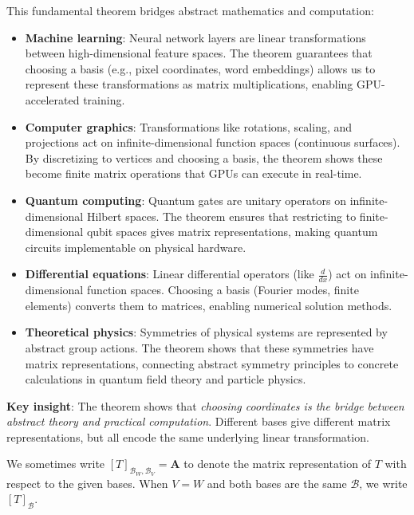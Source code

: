 \begin{remark}
  This fundamental theorem bridges abstract mathematics and computation:
  \begin{itemize}
    \item \textbf{Machine learning}: Neural network layers are linear transformations between high-dimensional feature spaces. The theorem guarantees that choosing a basis (e.g., pixel coordinates, word embeddings) allows us to represent these transformations as matrix multiplications, enabling GPU-accelerated training.

    \item \textbf{Computer graphics}: Transformations like rotations, scaling, and projections act on infinite-dimensional function spaces (continuous surfaces). By discretizing to vertices and choosing a basis, the theorem shows these become finite matrix operations that GPUs can execute in real-time.

    \item \textbf{Quantum computing}: Quantum gates are unitary operators on infinite-dimensional Hilbert spaces. The theorem ensures that restricting to finite-dimensional qubit spaces gives matrix representations, making quantum circuits implementable on physical hardware.

    \item \textbf{Differential equations}: Linear differential operators (like $\frac{d}{dx}$) act on infinite-dimensional function spaces. Choosing a basis (Fourier modes, finite elements) converts them to matrices, enabling numerical solution methods.

    \item \textbf{Theoretical physics}: Symmetries of physical systems are represented by abstract group actions. The theorem shows that these symmetries have matrix representations, connecting abstract symmetry principles to concrete calculations in quantum field theory and particle physics.
  \end{itemize}
  \textbf{Key insight}: The theorem shows that \emph{choosing coordinates is the bridge between abstract theory and practical computation}. Different bases give different matrix representations, but all encode the same underlying linear transformation.
\end{remark}



\begin{remark}
  We sometimes write $[T]_{\mathcal{B}_W,\mathcal{B}_V} = \mathbf{A}$ to denote the matrix representation of $T$ with respect to the given bases.
  When $V = W$ and both bases are the same $\mathcal{B}$, we write $[T]_{\mathcal{B}}$.
\end{remark}

